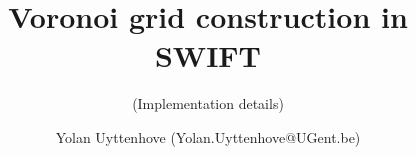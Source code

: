 




\title{Voronoi grid construction in SWIFT}
\subtitle{(Implementation details)}
\author{Yolan Uyttenhove (Yolan.Uyttenhove@UGent.be)}
\date{}







\newcommand{\Aij}{$\mathbf{A}_{ij}$}
\newcommand{\Aijm}{\mathbf{A}_{ij}}		%
\newcommand{\U}{\mathbf{U}}
\newcommand{\F}{\mathbf{F}}
\newcommand{\psitilde}{\tilde{\boldsymbol{\psi}}}






	



\maketitle





